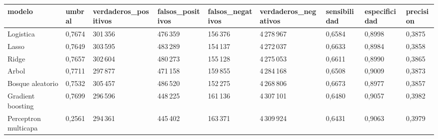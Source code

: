 \begin{tabular}{lllllllll}
\toprule
modelo & umbral & verdaderos\_positivos & falsos\_positivos & falsos\_negativos & verdaderos\_negativos & sensibilidad & especificidad & precision \\
\midrule
Logistica & 0{,}7674 & 301\,356 & 476\,359 & 156\,376 & 4\,278\,967 & 0{,}6584 & 0{,}8998 & 0{,}3875 \\
Lasso & 0{,}7649 & 303\,595 & 483\,289 & 154\,137 & 4\,272\,037 & 0{,}6633 & 0{,}8984 & 0{,}3858 \\
Ridge & 0{,}7657 & 302\,604 & 480\,273 & 155\,128 & 4\,275\,053 & 0{,}6611 & 0{,}8990 & 0{,}3865 \\
Arbol & 0{,}7711 & 297\,877 & 471\,158 & 159\,855 & 4\,284\,168 & 0{,}6508 & 0{,}9009 & 0{,}3873 \\
Bosque aleatorio & 0{,}7532 & 305\,457 & 486\,520 & 152\,275 & 4\,268\,806 & 0{,}6673 & 0{,}8977 & 0{,}3857 \\
Gradient boosting & 0{,}7699 & 296\,596 & 448\,225 & 161\,136 & 4\,307\,101 & 0{,}6480 & 0{,}9057 & 0{,}3982 \\
Perceptron multicapa & 0{,}2561 & 294\,361 & 445\,402 & 163\,371 & 4\,309\,924 & 0{,}6431 & 0{,}9063 & 0{,}3979 \\
\bottomrule
\end{tabular}
